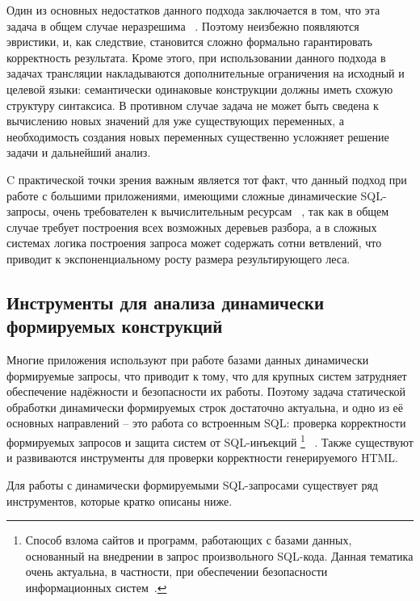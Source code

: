 \documentclass[a5paper]{article}
\begin{document}
Один из основных недостатков данного подхода заключается в том, что эта задача в общем случае неразрешима ~\cite{ALVOR2}. Поэтому неизбежно появляются эвристики, и, как следствие, становится сложно формально гарантировать корректность результата. Кроме этого, при использовании данного подхода в задачах  трансляции накладываются дополнительные ограничения на исходный и целевой языки: семантически одинаковые конструкции должны иметь схожую структуру синтаксиса. В противном случае задача не может быть сведена к вычислению новых значений для уже существующих переменных, а необходимость создания новых переменных существенно усложняет решение задачи и дальнейший анализ.

C практической точки зрения важным является тот факт, что данный подход при работе с  большими приложениями, имеющими  сложные динамические SQL-запросы, очень требователен к вычислительным ресурсам ~\cite{TiunovaUIInt}, так как в общем случае требует построения всех возможных деревьев разбора, а в сложных системах логика построения запроса может содержать сотни ветвлений, что приводит к экспоненциальному росту размера результирующего леса. 

\subsection{ Инструменты для анализа динамически формируемых конструкций}

Многие приложения используют при работе  базами данных динамически формируемые запросы, что приводит к тому, что для крупных систем затрудняет обеспечение надёжности и безопасности их работы. Поэтому задача статической обработки динамически формируемых строк достаточно актуальна, и одно из её основных направлений  -- это работа со встроенным SQL: проверка корректности формируемых запросов и защита систем от SQL-инъекций \footnote{Способ взлома сайтов и программ, работающих с базами данных, основанный на  внедрении в запрос произвольного SQL-кода. Данная тематика очень актуальна, в частности, при обеспечении безопасности информационных систем~\cite{SAForInject}.} ~\cite{SAForInject}. Также существуют и развиваются инструменты для проверки корректности генерируемого HTML.

Для работы с динамически формируемыми SQL-запросами существует ряд инструментов, которые кратко описаны ниже.
\end{document}
